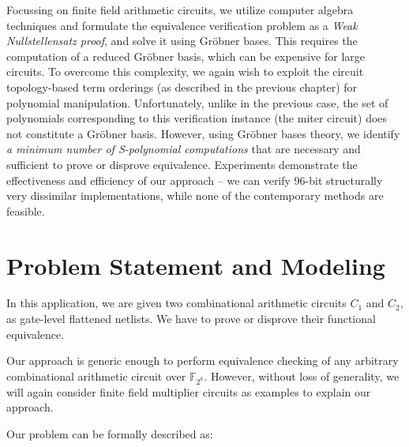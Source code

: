 Focussing on finite field arithmetic circuits, we utilize computer
algebra techniques and formulate the equivalence verification problem
as a  {\it Weak Nullstellensatz proof}, and solve it using Gr\"obner
bases. This requires the computation of a reduced Gr\"obner
basis, which can be expensive for large circuits.  To overcome this
complexity, we again wish to exploit the circuit topology-based term
orderings (as described in the previous chapter) for polynomial
manipulation.  Unfortunately, unlike in the previous case, 
the set of polynomials corresponding to this verification instance
(the miter circuit) does  not constitute a Gr\"obner basis. However,
using Gr\"obner bases theory,  we identify {\it a minimum number of
  S-polynomial computations} that are necessary and sufficient to
prove or disprove equivalence. Experiments demonstrate the
effectiveness and efficiency of our approach --  we can verify
$96$-bit structurally very dissimilar implementations, while none of
the contemporary methods are feasible. 

\section{Problem Statement and Modeling}

In this application, we are given two combinational arithmetic
circuits $C_{1}$ and $C_{2}$, as gate-level flattened netlists. 
We have to prove or disprove their functional equivalence. 

Our approach is generic enough to perform equivalence checking of
any arbitrary combinational arithmetic circuit over
$\mathbb{F}_{2^k}$. However, without loss of generality, we will again
consider finite field multiplier circuits as examples to explain our approach.

Our problem can be formally described as:

